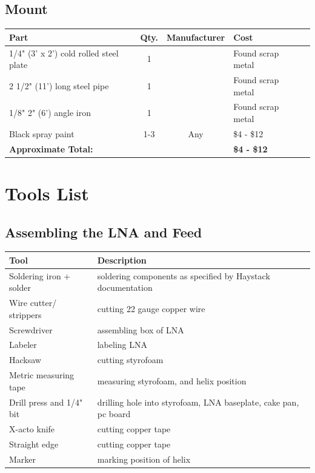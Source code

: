 \documentclass[11pt]{article} %
\begin{document}
\subsection{Mount}
\begin{tabular}{| p{6cm} | c | c | l | c |}
\hline
\textbf{Part} & \textbf{Qty.} & \textbf{Manufacturer} & \textbf{Cost} \\ \hline \hline
1/4" (3' x 2') cold rolled steel plate & 1 & & Found scrap metal \\ \hline	
2 1/2" (11') long steel pipe & 1 & &  Found scrap metal \\ \hline
1/8" 2" (6') angle iron	 & 1 & &  Found scrap metal \\ \hline
Black spray paint & 1-3 & Any & \$4 - \$12 \\ \hline
\textbf{Approximate Total:} & & & \textbf{\$4 - \$12} \\ \hline
\end{tabular}


\newpage

\section{Tools List}

\subsection{Assembling the LNA and Feed}
\begin{tabular}{| l | p{10cm} |}
\hline
\textbf{Tool} & \textbf{Description} \\ \hline \hline
Soldering iron + solder & soldering components as specified by Haystack documentation \\ \hline
Wire cutter/ strippers & cutting 22 gauge copper wire\\ \hline
Screwdriver & assembling box of LNA\\ \hline
Labeler & labeling LNA\\ \hline
Hacksaw & cutting styrofoam\\ \hline
Metric measuring tape & measuring styrofoam, and helix position\\ \hline
Drill press and 1/4" bit & drilling hole into styrofoam, LNA baseplate, cake pan, pc board\\ \hline
X-acto knife & cutting copper tape\\ \hline
Straight edge & cutting copper tape\\ \hline
Marker & marking position of helix\\ \hline
\end{tabular}
\end{document}
